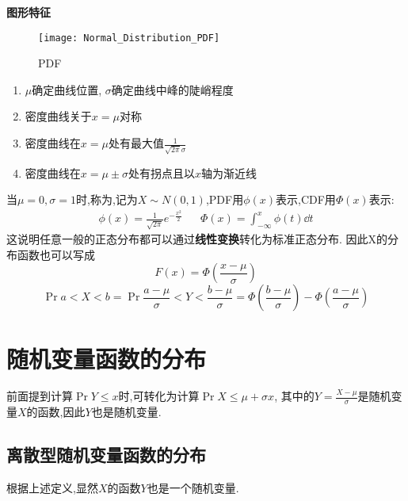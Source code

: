 \textbf{图形特征}
\begin{figure}[h]
    \centering
    \texttt{[image: Normal\_Distribution\_PDF]}
    \caption{PDF}
\end{figure}
\begin{enumerate}
    \item $\mu$确定曲线位置, $\sigma$确定曲线中峰的陡峭程度
    \item 密度曲线关于$x=\mu$对称
    \item 密度曲线在$x=\mu$处有最大值$\frac{1}{\sqrt{2\pi}\sigma}$
    \item 密度曲线在$x=\mu\pm\sigma$处有拐点且以$x$轴为渐近线
\end{enumerate}
当$\mu=0,\sigma=1$时,称为,记为$X\sim N(0,1)$,PDF用$\phi(x )$表示,CDF用$\Phi(x )$表示:
\begin{align}
    \phi(x ) = \frac{1}{\sqrt{2\pi}}e^{-\frac{x^2}{2}} &  & \Phi(x ) = \int_{-\infty}^{x}\phi(t)\dd{t}
    \label{eq:2.13}
\end{align}
这说明任意一般的正态分布都可以通过\textbf{线性变换}转化为标准正态分布.
因此X的分布函数也可以写成
\[F(x) = \Phi\left(\frac{x-\mu}{\sigma}\right)\]
\[\Pr{a<X<b}= \Pr{\frac{a-\mu}{\sigma}<Y<\frac{b-\mu}{\sigma}} = \Phi\left(\frac{b-\mu}{\sigma}\right) - \Phi\left(\frac{a-\mu}{\sigma}\right)\]
\section{随机变量函数的分布}
前面提到计算$\Pr{Y\leq x}$时,可转化为计算$\Pr{X\leq \mu + \sigma x}$, 其中的$Y=\frac{X-\mu}{\sigma}$是随机变量$X$的函数,因此$Y$也是随机变量.
\subsection{离散型随机变量函数的分布}
根据上述定义,显然$X$的函数$Y$也是一个随机变量.
